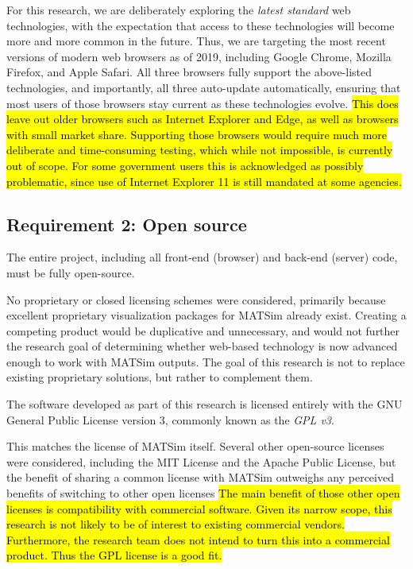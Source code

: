 \documentclass[Afour,sagev,times]{sagej}
\begin{document}
For this research, we are deliberately exploring the \textit{latest standard} web technologies, with the expectation that access to these technologies will become more and more common in the future. Thus, we are targeting the most recent versions of modern web browsers as of 2019, including Google Chrome, Mozilla Firefox,
and Apple Safari. All three browsers fully support the above-listed technologies, and importantly, all three auto-update automatically, ensuring that most users of those browsers stay current as these technologies evolve. \hl{This does leave out older browsers such as Internet Explorer and Edge, as well as browsers with small market share. Supporting those browsers would require much more deliberate and time-consuming testing, which while not impossible, is currently out of scope. For some government users this is acknowledged as possibly problematic, since use of Internet Explorer 11 is still mandated at some agencies.}

\subsection{Requirement 2: Open source}

The entire project, including all front-end (browser) and back-end (server) code, must be fully open-source.

No proprietary or closed licensing schemes were considered, primarily because excellent proprietary visualization packages for MATSim already exist. Creating a competing product would be duplicative and unnecessary, and would not further the research goal of determining whether web-based technology is now advanced enough to work with MATSim outputs. The goal of this research is not to replace existing proprietary solutions, but rather to complement them.

The software developed as part of this research is licensed entirely with the GNU General Public License version 3, commonly known as the \textit{GPL v3}\cite{R4}.

This matches the license of MATSim itself. Several other open-source licenses were considered, including the MIT License and the Apache Public License, but the benefit of sharing a common license with MATSim outweighs any perceived benefits of switching to other open licenses \hl{The main benefit of those other open licenses is compatibility with commercial software. Given its narrow scope, this research is not likely to be of interest to existing commercial vendors. Furthermore, the research team does not intend to turn this into a commercial product. Thus the GPL license is a good fit.}
\end{document}
